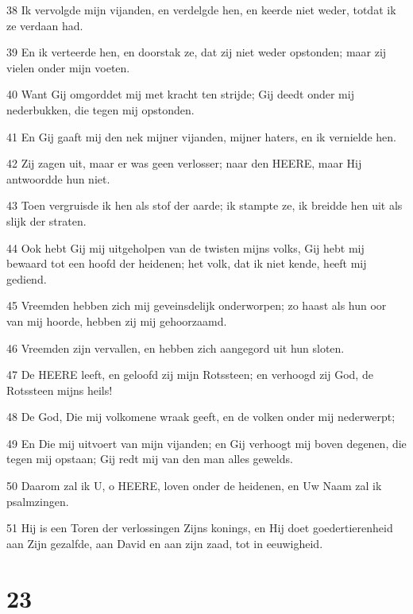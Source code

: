 \par 38 Ik vervolgde mijn vijanden, en verdelgde hen, en keerde niet weder, totdat ik ze verdaan had.
\par 39 En ik verteerde hen, en doorstak ze, dat zij niet weder opstonden; maar zij vielen onder mijn voeten.
\par 40 Want Gij omgorddet mij met kracht ten strijde; Gij deedt onder mij nederbukken, die tegen mij opstonden.
\par 41 En Gij gaaft mij den nek mijner vijanden, mijner haters, en ik vernielde hen.
\par 42 Zij zagen uit, maar er was geen verlosser; naar den HEERE, maar Hij antwoordde hun niet.
\par 43 Toen vergruisde ik hen als stof der aarde; ik stampte ze, ik breidde hen uit als slijk der straten.
\par 44 Ook hebt Gij mij uitgeholpen van de twisten mijns volks, Gij hebt mij bewaard tot een hoofd der heidenen; het volk, dat ik niet kende, heeft mij gediend.
\par 45 Vreemden hebben zich mij geveinsdelijk onderworpen; zo haast als hun oor van mij hoorde, hebben zij mij gehoorzaamd.
\par 46 Vreemden zijn vervallen, en hebben zich aangegord uit hun sloten.
\par 47 De HEERE leeft, en geloofd zij mijn Rotssteen; en verhoogd zij God, de Rotssteen mijns heils!
\par 48 De God, Die mij volkomene wraak geeft, en de volken onder mij nederwerpt;
\par 49 En Die mij uitvoert van mijn vijanden; en Gij verhoogt mij boven degenen, die tegen mij opstaan; Gij redt mij van den man alles gewelds.
\par 50 Daarom zal ik U, o HEERE, loven onder de heidenen, en Uw Naam zal ik psalmzingen.
\par 51 Hij is een Toren der verlossingen Zijns konings, en Hij doet goedertierenheid aan Zijn gezalfde, aan David en aan zijn zaad, tot in eeuwigheid.

\chapter{23}

